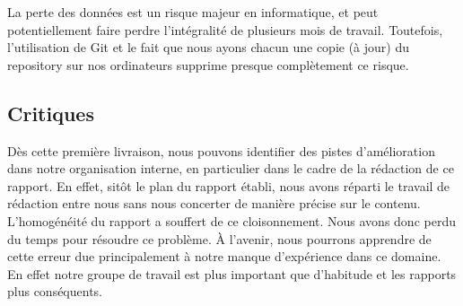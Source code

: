 	    La perte des données est un risque majeur en informatique, et peut potentiellement faire perdre l'intégralité de plusieurs mois de travail. Toutefois, l'utilisation de Git et le fait que nous ayons chacun une copie (à jour) du repository sur nos ordinateurs supprime presque complètement ce risque.

	\subsection{Critiques}

		Dès cette première livraison, nous pouvons identifier des pistes d'amélioration dans notre organisation interne, en particulier dans le cadre de la rédaction de ce rapport. En effet, sitôt le plan du rapport établi, nous avons réparti le travail de rédaction entre nous sans nous concerter de manière précise sur le contenu. L'homogénéité du rapport a souffert de ce cloisonnement. Nous avons donc perdu du temps pour résoudre ce problème. \`A l'avenir, nous pourrons apprendre de cette erreur due principalement à notre manque d'expérience dans ce domaine. En effet notre groupe de travail est plus important que d'habitude et les rapports plus conséquents.